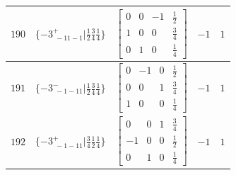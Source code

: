 \documentclass[fleqn,8pt]{jsarticle}
\begin{document}
\begin{longtable}{ccccc}
$ 190 $ & $ \{-3^{+}_{\,\,-11-1}|\frac{1}{2} \frac{3}{4} \frac{1}{4}\} $ & $ \begin{bmatrix} 0 & 0 & -1 & \frac{1}{2} \\ 1 & 0 & 0 & \frac{3}{4} \\ 0 & 1 & 0 & \frac{1}{4} \end{bmatrix} $ & $ -1 $ & $ 1 $ \\ \hline
$ 191 $ & $ \{-3^{-}_{\,\,-1-11}|\frac{1}{2} \frac{3}{4} \frac{1}{4}\} $ & $ \begin{bmatrix} 0 & -1 & 0 & \frac{1}{2} \\ 0 & 0 & 1 & \frac{3}{4} \\ 1 & 0 & 0 & \frac{1}{4} \end{bmatrix} $ & $ -1 $ & $ 1 $ \\ \hline
$ 192 $ & $ \{-3^{+}_{\,\,-1-11}|\frac{3}{4} \frac{1}{2} \frac{1}{4}\} $ & $ \begin{bmatrix} 0 & 0 & 1 & \frac{3}{4} \\ -1 & 0 & 0 & \frac{1}{2} \\ 0 & 1 & 0 & \frac{1}{4} \end{bmatrix} $ & $ -1 $ & $ 1 $ \\
\end{longtable}
\end{document}
